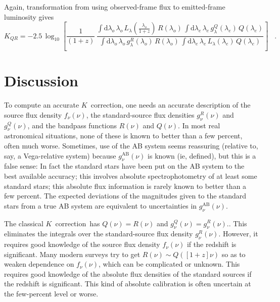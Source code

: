 \documentclass[preprint]{aastex}
\newcommand{\kcorrection}{$K$~correction}
\newcommand{\lambdaobs}{\lambda_o}
\newcommand{\lambdaemit}{\lambda_e}
\begin{document}
Again, transformation from using observed-frame flux to emitted-frame
luminosity gives
\begin{equation}
\label{eq:wavelengthL}
K_{QR} = -2.5\,\log_{10}\left[\frac{1}{(1+z)}\,
  \frac{\displaystyle
  \int\mathrm{d}\lambdaobs\,\lambdaobs\,L_{\lambda}\left(\frac{\lambdaobs}{1+z}\right)\,R(\lambdaobs)\,
    \int\mathrm{d}\lambdaemit\,\lambdaemit\,
    g^Q_{\lambda}(\lambdaemit)\,Q(\lambdaemit)}
       {\displaystyle
  \int\mathrm{d}\lambdaobs\,\lambdaobs\,g^R_{\lambda}(\lambdaobs)\,R(\lambdaobs)\,
    \int\mathrm{d}\lambdaemit\,\lambdaemit\,
    L_{\lambda}(\lambdaemit)\,Q(\lambdaemit)}
\right] \;\;\;.
\end{equation}

\section{Discussion}

To compute an accurate \kcorrection, one needs an accurate description
of the source flux density $f_{\nu}(\nu)$, the standard-source flux
densities $g^R_{\nu}(\nu)$ and $g^Q_{\nu}(\nu)$, and the bandpass
functions $R(\nu)$ and $Q(\nu)$.  In most real astronomical
situations, none of these is known to better than a few percent, often
much worse.  Sometimes, use of the AB system seems reassuring
(relative to, say, a Vega-relative system) because
$g^\mathrm{AB}_{\nu}(\nu)$ is known (ie, defined), but this is a false
sense: In fact the standard stars have been put on the AB system to
the best available accuracy; this involves absolute spectrophotometry
of at least some standard stars; this absolute flux information is
rarely known to better than a few percent.  The expected deviations of
the magnitudes given to the standard stars from a true AB system are
equivalent to uncertainties in $g^\mathrm{AB}_{\nu}(\nu)$.

The classical \kcorrection\ has $Q(\nu)=R(\nu)$ and
$g^Q_{\nu}(\nu)=g^R_{\nu}(\nu)$..  This eliminates the integrals over
the standard-source flux density $g^R_{\nu}(\nu)$.  However, it
requires good knowledge of the source flux density $f_{\nu}(\nu)$ if
the redshift is significant.  Many modern surveys try to get
$R(\nu)\sim Q([1+z]\nu)$ so as to weaken dependence on $f_{\nu}(\nu)$,
which can be complicated or unknown.  This requires good knowledge of
the absolute flux densities of the standard sources if the redshift is
significant.  This kind of absolute calibration is often uncertain at
the few-percent level or worse.
\end{document}

